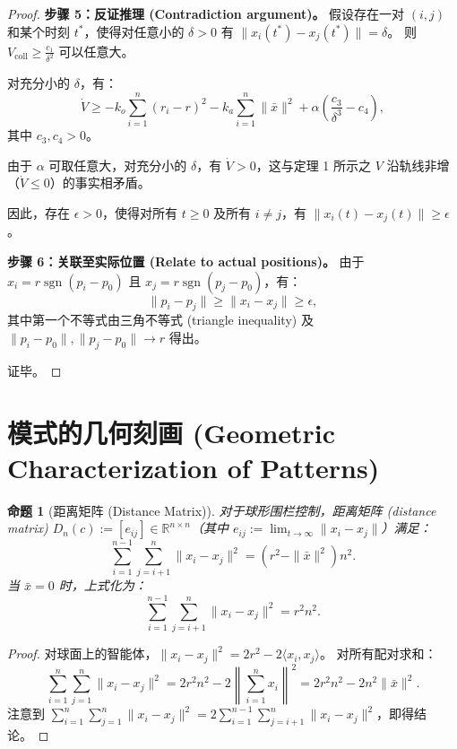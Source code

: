 \documentclass{ctexart}
\DeclareMathOperator{\sgn}{sgn}
\newtheorem{proposition}[theorem]{命题}
\begin{document}
\begin{proof}
\textbf{步骤 5：反证推理 (Contradiction argument)。}
假设存在一对 $(i,j)$ 和某个时刻 $t^*$，使得对任意小的 $\delta > 0$ 有 $\|x_i(t^*) - x_j(t^*)\| = \delta$。
则 $V_{\text{coll}} \geq \frac{c_1}{\delta^2}$ 可以任意大。

对充分小的 $\delta$，有：
\begin{equation}
\dot{V} \geq -k_o \sum_{i=1}^{n} (r_i - r)^2 - k_a \sum_{i=1}^{n} \|\bar{x}\|^2 + \alpha \left( \frac{c_3}{\delta^3} - c_4 \right),
\end{equation}
其中 $c_3, c_4 > 0$。

由于 $\alpha$ 可取任意大，对充分小的 $\delta$，有 $\dot{V} > 0$，这与定理 1 所示之 $V$ 沿轨线非增（$\dot{V} \leq 0$）的事实相矛盾。

因此，存在 $\epsilon > 0$，使得对所有 $t \geq 0$ 及所有 $i \neq j$，有 $\|x_i(t) - x_j(t)\| \geq \epsilon$。

\textbf{步骤 6：关联至实际位置 (Relate to actual positions)。}
由于 $x_i = r \sgn(p_i - p_0)$ 且 $x_j = r \sgn(p_j - p_0)$，有：
\begin{equation}
\|p_i - p_j\| \geq \|x_i - x_j\| \geq \epsilon,
\end{equation}
其中第一个不等式由三角不等式 (triangle inequality) 及 $\|p_i - p_0\|, \|p_j - p_0\| \to r$ 得出。

证毕。
\end{proof}



\section{模式的几何刻画 (Geometric Characterization of Patterns)}

\begin{proposition}[距离矩阵 (Distance Matrix)]
对于球形围栏控制，距离矩阵 (distance matrix) $D_n(c) := [e_{ij}] \in \mathbb{R}^{n \times n}$（其中 $e_{ij} := \lim_{t \to \infty} \|x_i - x_j\|$）满足：
\begin{equation}
\sum_{i=1}^{n-1} \sum_{j=i+1}^{n} \|x_i - x_j\|^2 = (r^2 - \|\bar{x}\|^2)n^2.
\end{equation}
当 $\bar{x} = 0$ 时，上式化为：
\begin{equation}
\sum_{i=1}^{n-1} \sum_{j=i+1}^{n} \|x_i - x_j\|^2 = r^2 n^2.
\end{equation}
\end{proposition}

\begin{proof}
对球面上的智能体，$\|x_i - x_j\|^2 = 2r^2 - 2\langle x_i, x_j \rangle$。
对所有配对求和：
\begin{equation}
\sum_{i=1}^{n} \sum_{j=1}^{n} \|x_i - x_j\|^2 = 2r^2 n^2 - 2\left\| \sum_{i=1}^{n} x_i \right\|^2 = 2r^2 n^2 - 2n^2 \|\bar{x}\|^2.
\end{equation}
注意到 $\sum_{i=1}^{n} \sum_{j=1}^{n} \|x_i - x_j\|^2 = 2 \sum_{i=1}^{n-1} \sum_{j=i+1}^{n} \|x_i - x_j\|^2$，即得结论。
\end{proof}
\end{document}
